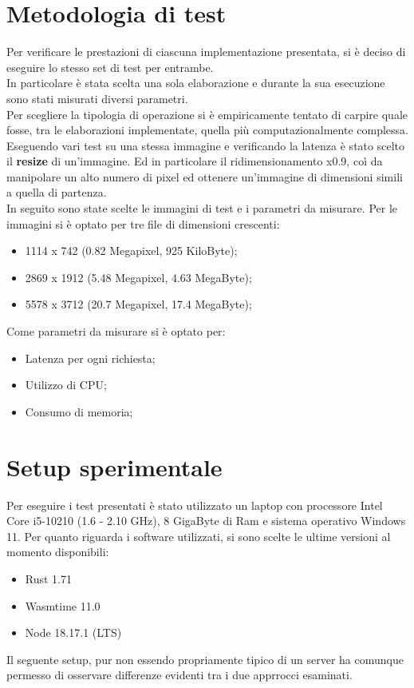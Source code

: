\section{Metodologia di test}
Per verificare le prestazioni di ciascuna implementazione presentata, si è deciso di eseguire lo stesso set di test per entrambe.
\\In particolare è stata scelta una sola elaborazione e durante la sua esecuzione sono stati misurati diversi parametri.
\\Per scegliere la tipologia di operazione si è empiricamente tentato di carpire quale fosse, tra le elaborazioni implementate, quella più computazionalmente complessa.
Eseguendo vari test su una stessa immagine e verificando la latenza è stato scelto il \textbf{resize} di un'immagine.
Ed in particolare il ridimensionamento x0.9, coì da manipolare un alto numero di pixel ed ottenere un'immagine di dimensioni simili a quella di partenza. 
\\In seguito sono state scelte le immagini di test e i parametri da misurare.
Per le immagini si è optato per tre file di dimensioni crescenti:
\begin{itemize}
    \item 1114 x 742 (0.82 Megapixel, 925 KiloByte);
    \item 2869 x 1912 (5.48 Megapixel, 4.63 MegaByte);
    \item 5578 x 3712 (20.7 Megapixel, 17.4 MegaByte);
\end{itemize}
Come parametri da misurare si è optato per:
\begin{itemize}
    \item Latenza per ogni richiesta;
    \item Utilizzo di CPU;
    \item Consumo di memoria;
\end{itemize}
\section{Setup sperimentale}
Per eseguire i test presentati è stato utilizzato un laptop con processore Intel Core i5-10210 (1.6 - 2.10 GHz), 8 GigaByte di Ram e sistema operativo Windows 11.
Per quanto riguarda i software utilizzati, si sono scelte le ultime versioni al momento disponibili:
\begin{itemize}
    \item Rust 1.71
    \item Wasmtime 11.0
    \item Node 18.17.1 (LTS)
\end{itemize}
Il seguente setup, pur non essendo propriamente tipico di un server ha comunque permesso di osservare differenze evidenti tra i due apprrocci esaminati.
